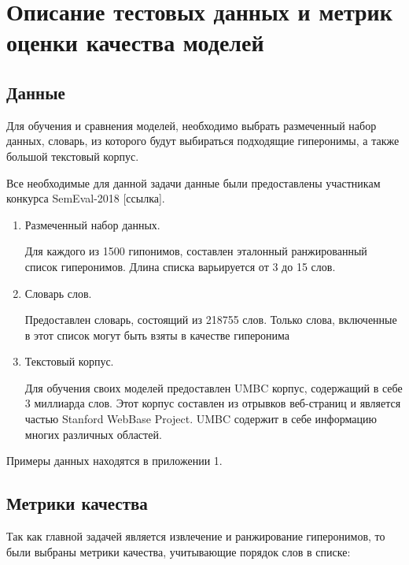 \section{Описание тестовых данных и метрик оценки качества моделей}
\label{sec:Chapter_3} 
\large


\subsection{Данные}

Для обучения и сравнения моделей, необходимо выбрать размеченный набор данных,
словарь, из которого будут выбираться подходящие гиперонимы, а также большой
текстовый корпус.

Все необходимые для данной задачи данные были предоставлены участникам конкурса
SemEval-2018 [ссылка].

\begin{enumerate}
\item Размеченный набор данных.

Для каждого из 1500 гипонимов, составлен эталонный ранжированный список
гиперонимов. Длина списка варьируется от 3 до 15 слов.

\item Словарь слов.

Предоставлен словарь, состоящий из 218755 слов. Только слова, включенные в
этот список могут быть взяты в качестве гиперонима

\item Текстовый корпус.

Для обучения своих моделей предоставлен UMBC корпус, содержащий в себе 3
миллиарда слов. Этот корпус составлен из отрывков веб-страниц и является частью
Stanford WebBase Project. UMBC содержит в себе информацию многих различных
областей.
\end{enumerate}

Примеры данных находятся в приложении 1.


\subsection{Метрики качества}

Так как главной задачей является извлечение и ранжирование гиперонимов, то были
выбраны метрики качества, учитывающие порядок слов в списке:

